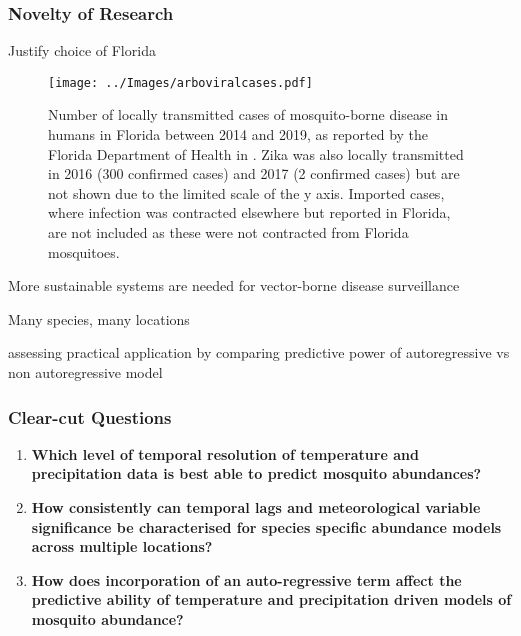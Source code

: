 \subsubsection{Novelty of Research}

Justify choice of Florida

\begin{figure}[h]
	\centering
	\texttt{[image: ../Images/arboviralcases.pdf]}
	\caption{Number of locally transmitted cases of mosquito-borne disease in humans in Florida between 2014 and 2019, as reported by the Florida Department of Health in  \citeyear{DiseaseSurveillance}. Zika was also locally transmitted in 2016 (300 confirmed cases) and 2017 (2 confirmed cases) but are not shown due to the limited scale of the y axis. Imported cases, where infection was contracted elsewhere but reported in Florida, are not included as these were not contracted from Florida mosquitoes. %
	}
	\label{fig:FDcases}
\end{figure}

More sustainable systems are needed for vector-borne disease surveillance \citep{Vazquez-Prokopec2010}

Many species, many locations

assessing practical application by comparing predictive power of autoregressive vs non autoregressive model

\subsubsection{Clear-cut Questions}
\begin{enumerate}
	

	\item \textbf{Which level of temporal resolution of temperature and precipitation data is best able to predict mosquito abundances?}
	
	\item \textbf{How consistently can temporal lags and meteorological variable significance be characterised for species specific abundance models across multiple locations?}
	
	\item \textbf{How does incorporation of an auto-regressive term affect the predictive ability of temperature and precipitation driven models of mosquito abundance?}
\end{enumerate}

